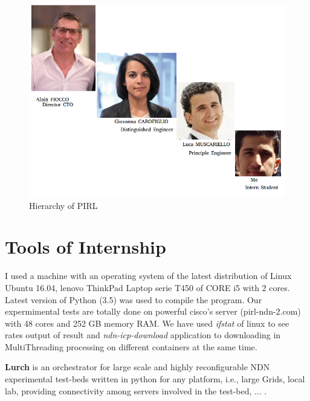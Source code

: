 \begin{figure}

\begin{center}

\includegraphics[scale = 0.3]{Pictures/photos.png}

\caption{Hierarchy of PIRL} \label{photos} 

\end{center}

\end{figure}




\section{Tools of Internship}

I used a machine with an operating system of the latest distribution of Linux Ubuntu 16.04, lenovo ThinkPad Laptop serie T450 of CORE i5 with 2 cores. Latest version of Python (3.5) was used to compile the program.  Our expermimental tests are totally done on powerful cisco's server (pirl-ndn-2.com) with 48 cores and 252 GB memory RAM. We have used \textit{ifstat} of linux to see rates output of result and \textit{ndn-icp-download} application to downloading in MultiThreading processing on different containers at the same time.

\textbf{\LARGE{Lurch}} is an orchestrator for large scale and highly reconfigurable NDN experimental test-beds written in python for any platform, i.e., large Grids, local lab, providing connectivity among servers involved in the test-bed, ... .


